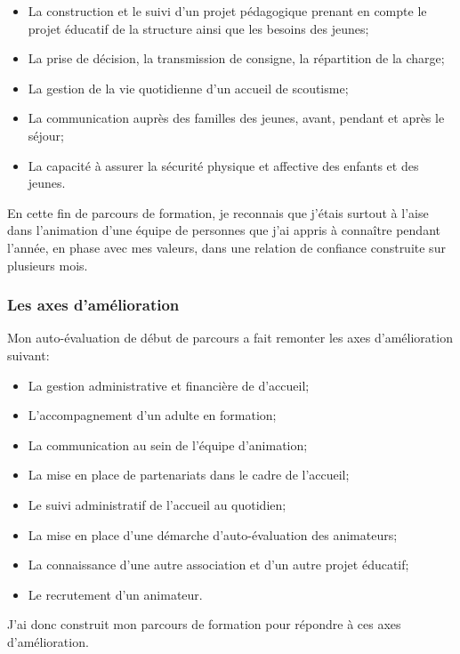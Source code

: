 \documentclass[titlepage,11pt,a4paper]{article}
\begin{document}
\begin{itemize}
   \item La construction et le suivi d'un projet pédagogique prenant en compte le
      projet éducatif de la structure ainsi que les besoins des jeunes;
   \item La prise de décision, la transmission de consigne, la répartition de la charge;
   \item La gestion de la vie quotidienne d'un accueil de scoutisme;
   \item La communication auprès des familles des jeunes, avant, pendant et après le
      séjour;
   \item La capacité à assurer la sécurité physique et affective des enfants et des
      jeunes.
\end{itemize}

En cette fin de parcours de formation, je reconnais que j'étais surtout à l'aise dans
l'animation d'une équipe de personnes que j'ai appris à connaître pendant l'année,
en phase avec mes valeurs, dans une relation de confiance construite sur plusieurs mois.

\subsubsection{Les axes d'amélioration}

Mon auto-évaluation de début de parcours a fait remonter les axes d'amélioration suivant:

\begin{itemize}
   \item La gestion administrative et financière de d'accueil;
   \item L'accompagnement d'un adulte en formation;
   \item La communication au sein de l'équipe d'animation;
   \item La mise en place de partenariats dans le cadre de l'accueil;
   \item Le suivi administratif de l'accueil au quotidien;
   \item La mise en place d'une démarche d'auto-évaluation des animateurs;
   \item La connaissance d'une autre association et d'un autre projet éducatif;
   \item Le recrutement d'un animateur.
\end{itemize}

J'ai donc construit mon parcours de formation pour répondre à ces axes d'amélioration.
\end{document}
